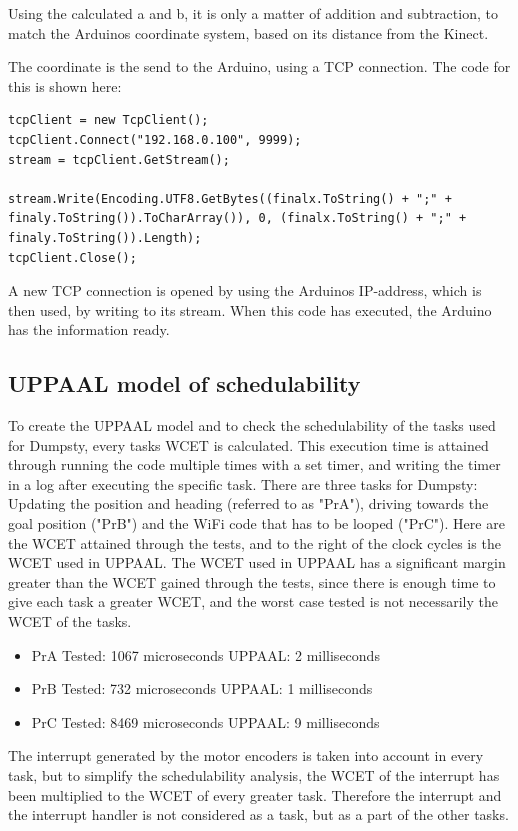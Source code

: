 Using the calculated a and b, it is only a matter of addition and subtraction, to match the Arduinos coordinate system, based on its distance from the Kinect.

The coordinate is the send to the Arduino, using a TCP connection.
The code for this is shown here:
\begin{lstlisting}
tcpClient = new TcpClient();
tcpClient.Connect("192.168.0.100", 9999);
stream = tcpClient.GetStream();

stream.Write(Encoding.UTF8.GetBytes((finalx.ToString() + ";" + finaly.ToString()).ToCharArray()), 0, (finalx.ToString() + ";" + finaly.ToString()).Length);
tcpClient.Close();
\end{lstlisting}

A new TCP connection is opened by using the Arduinos IP-address, which is then used, by writing to its stream.
When this code has executed, the Arduino has the information ready.

\subsection{UPPAAL model of schedulability}
\label{sec:i3UPPAAL model}
To create the UPPAAL model and to check the schedulability of the tasks used for Dumpsty, every tasks WCET is calculated. This execution time is attained through running the code multiple times with a set timer, and writing the timer in a log after executing the specific task. There are three tasks for Dumpsty: Updating the position and heading (referred to as "PrA"), driving towards the goal position ("PrB") and the WiFi code that has to be looped ("PrC"). Here are the WCET attained through the tests, and to the right of the clock cycles is the WCET used in UPPAAL. The WCET used in UPPAAL has a significant margin greater than the WCET gained through the tests, since there is enough time to give each task a greater WCET, and the worst case tested is not necessarily the WCET of the tasks. 

\begin{itemize}
	\item PrA \tab Tested: 1067 microseconds \tab UPPAAL: 2 milliseconds
	\item PrB \tab Tested: 732  microseconds \tab UPPAAL: 1 milliseconds
	\item PrC \tab	Tested: 8469 microseconds \tab UPPAAL: 9 milliseconds
\end{itemize}

The interrupt generated by the motor encoders is taken into account in every task, but to simplify the schedulability analysis, the WCET of the interrupt has been multiplied to the WCET of every greater task. Therefore the interrupt and the interrupt handler is not considered as a task, but as a part of the other tasks.

